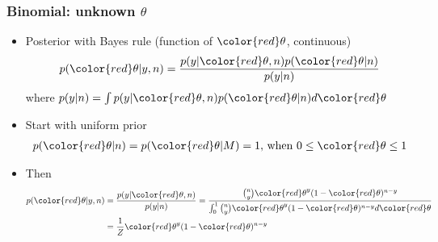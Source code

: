 \documentclass[english,t]{beamer}
\begin{document}
\begin{frame}
  \frametitle{Binomial: unknown $\theta$}

  \begin{itemize}
  \item {\color{blue}Posterior} with Bayes rule (function of ${\color{red}\theta}$, continuous)
    \begin{equation*}
      p({\color{red}\theta}|y,n)=\frac{p(y|{\color{red}\theta},n)p({\color{red}\theta}|n)}{p(y|n)}
    \end{equation*}
    \pause
    where $p(y|n)=\int p(y|{\color{red}\theta},n)p({\color{red}\theta}|n) d{\color{red}\theta}$
  \item<3-> Start with uniform prior
    \begin{align*}
      p({\color{red}\theta}|n)=p({\color{red}\theta}|M)=1,\, \text{when}\,\, 0\leq{\color{red}\theta}\leq 1
    \end{align*}
  \item<4-> Then
    \begin{align*}
      p({\color{red}\theta}|y,n)&=\frac{p(y|{\color{red}\theta},n)}{p(y|n)} 
      =\frac{\binom{n}{y} {\color{red}\theta}^y(1-{\color{red}\theta})^{n-y}}{\int_0^1
        \binom{n}{y} {\color{red}\theta}^y(1-{\color{red}\theta})^{n-y} d{\color{red}\theta}} \\
        &=\frac{1}{Z}{\color{red}\theta}^y(1-{\color{red}\theta})^{n-y}
    \end{align*}
  \end{itemize}

\end{frame}
\end{document}
